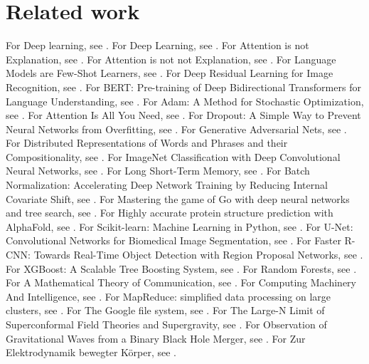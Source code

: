 \documentclass{article}
\begin{document}
\section{Related work}
For Deep learning, see \citet{lecun2015deep}.
For Deep Learning, see \citet{goodfellow2016book}.
For Attention is not Explanation, see \citet{jain2019attention}.
For Attention is not not Explanation, see \citet{wiegreffe2019attention}.
For Language Models are Few-Shot Learners, see \citet{brown2020language}.
For Deep Residual Learning for Image Recognition, see \citet{he2016deep}.
For BERT: Pre-training of Deep Bidirectional Transformers for Language Understanding, see \citet{devlin2019bert}.
For Adam: A Method for Stochastic Optimization, see \citet{kingma2015adam}.
For Attention Is All You Need, see \citet{vaswani2017attention}.
For Dropout: A Simple Way to Prevent Neural Networks from Overfitting, see \citet{srivastava2014dropout}.
For Generative Adversarial Nets, see \citet{goodfellow2014gan}.
For Distributed Representations of Words and Phrases and their Compositionality, see \citet{mikolov2013distributed}.
For ImageNet Classification with Deep Convolutional Neural Networks, see \citet{krizhevsky2012imagenet}.
For Long Short-Term Memory, see \citet{hochreiter1997long}.
For Batch Normalization: Accelerating Deep Network Training by Reducing Internal Covariate Shift, see \citet{ioffe2015batch}.
For Mastering the game of Go with deep neural networks and tree search, see \citet{silver2016mastering}.
For Highly accurate protein structure prediction with AlphaFold, see \citet{jumper2021alphafold}.
For Scikit-learn: Machine Learning in Python, see \citet{pedregosa2011scikit}.
For U-Net: Convolutional Networks for Biomedical Image Segmentation, see \citet{ronneberger2015unet}.
For Faster R-CNN: Towards Real-Time Object Detection with Region Proposal Networks, see \citet{ren2015faster}.
For XGBoost: A Scalable Tree Boosting System, see \citet{chen2016xgboost}.
For Random Forests, see \citet{breiman2001random}.
For A Mathematical Theory of Communication, see \citet{shannon1948mathematical}.
For Computing Machinery And Intelligence, see \citet{turing1950computing}.
For MapReduce: simplified data processing on large clusters, see \citet{dean2008mapreduce}.
For The Google file system, see \citet{ghemawat2003google}.
For The Large-N Limit of Superconformal Field Theories and Supergravity, see \citet{maldacena1999large}.
For Observation of Gravitational Waves from a Binary Black Hole Merger, see \citet{abbott2016observation}.
For Zur Elektrodynamik bewegter Körper, see \citet{einstein1905elektrodynamik}.
\end{document}
